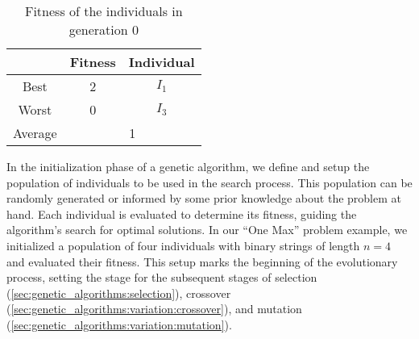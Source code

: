   \begin{table}[H]
    \centering
    \begin{tabular}{|c|c|c|}
      \hline
      & \textbf{Fitness} & \textbf{Individual}  \\
      \hline
      Best & 2 & \(I_1\) \\
      Worst & 0 & \(I_3\) \\
      \hline
      \hline
      Average & \multicolumn{2}{c|}{1} \\
      \hline
    \end{tabular}
    \caption{Fitness of the individuals in generation 0}
    \label{tab:genetic_algorithms:initialization:population_fitness}
  \end{table}
  
  In the initialization phase of a genetic algorithm, we define and setup the population of 
  individuals to be used in the search process. 
  This population can be randomly generated or informed by some prior knowledge about the problem at 
  hand. 
  Each individual is evaluated to determine its fitness, guiding the algorithm's search for optimal 
  solutions. 
  In our \enquote{One Max} problem example, we initialized a population of four individuals with 
  binary strings of length \(n = 4\) and evaluated their fitness. 
  This setup marks the beginning of the evolutionary process, setting the stage for the subsequent 
  stages of selection (\vref{sec:genetic_algorithms:selection}), 
  crossover (\vref{sec:genetic_algorithms:variation:crossover}), and 
  mutation (\vref{sec:genetic_algorithms:variation:mutation}).
